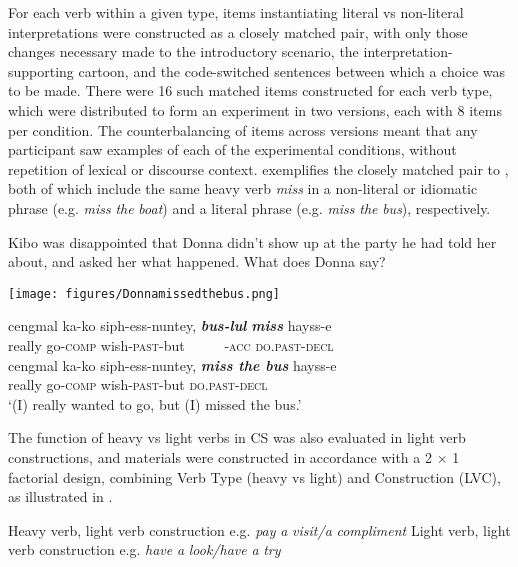 For each verb within a given type, items instantiating literal vs non-literal interpretations were constructed as a closely matched pair, with only those changes necessary made to the introductory scenario, the interpretation-supporting cartoon, and the code-switched sentences between which a choice was to be made. There were 16 such matched items constructed for each verb type, which were distributed to form an experiment in two versions, each with 8 items per condition. The counterbalancing of items across versions meant that any participant saw examples of each of the experimental conditions, without repetition of lexical or discourse context.  exemplifies the closely matched pair to , both of which include the same heavy verb \textit{miss} in a non-literal or idiomatic phrase (e.g. \textit{miss} \textit{the} \textit{boat}) and a literal phrase (e.g. \textit{miss} \textit{the} \textit{bus}), respectively.

\ea\label{ex:37}
Kibo was disappointed that Donna didn’t show up at the party he had told her about, and asked her what happened. What does Donna say?

\sn \begin{center} \texttt{[image: figures/Donnamissedthebus.png]} \end{center}

    \ea \gll cengmal ka-ko siph-ess-nuntey, \textbf{\textit{bus-lul}} \textbf{\textit{miss}} hayss-e \\
    really go-\textsc{comp} wish-\textsc{past}-but {~~~~~}-\textsc{acc} {} \textsc{do.past-decl} \\
    \ex \gll cengmal ka-ko siph-ess-nuntey, \textbf{\textit{miss the bus}} hayss-e\\
    really go-\textsc{comp} wish-\textsc{past}-but {} \textsc{do.past-decl} \\
    \glt  `(I) really wanted to go, but (I) missed the bus.'
    \z
\z
       

The function of heavy vs light verbs in \ac{CS} was also evaluated in light verb constructions, and materials were constructed in accordance with a 2 × 1 factorial design, combining Verb Type (heavy vs light) and Construction (\acl{LVC}), as illustrated in .

\begin{exe}\ex\label{ex:38}
    \begin{xlist}\ex  Heavy verb, light verb construction   \hfill  e.g. \textit{pay} \textit{a} \textit{visit/a} \textit{compliment}
    \ex  Light verb, light verb construction \hfill   e.g. \textit{have} \textit{a} \textit{look/have} \textit{a} \textit{try}
    \end{xlist}
\end{exe}

